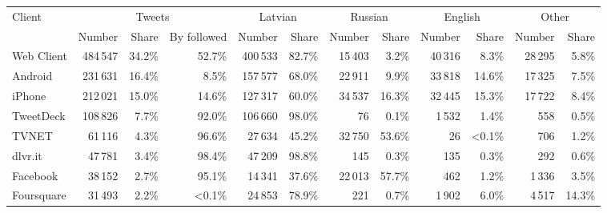 \begin{tabular}{lrrrrrrrrrrr}
\toprule
\multirow{2}{*}{Client} & \multicolumn{3}{c}{Tweets} & \multicolumn{2}{c}{Latvian} & \multicolumn{2}{c}{Russian} & \multicolumn{2}{c}{English} & \multicolumn{2}{c}{Other} \\
\cmidrule(r){2-4} \cmidrule(r){5-6} \cmidrule(r){7-8} \cmidrule(r){9-10} \cmidrule(r){11-12}
{} & Number & Share & By followed & Number & Share & Number & Share & Number & Share & Number & Share \\
\midrule
Web Client          &      484\,547   &       34.2\% &                52.7\% &            400\,533 &             82.7\% &             15\,403 &              3.2\% &             40\,316 &              8.3\% &            28\,295 &             5.8\% \\
Android             &      231\,631   &       16.4\% &                 8.5\% &            157\,577 &             68.0\% &             22\,911 &              9.9\% &             33\,818 &             14.6\% &            17\,325 &             7.5\% \\
iPhone              &      212\,021   &       15.0\% &                14.6\% &            127\,317 &             60.0\% &             34\,537 &             16.3\% &             32\,445 &             15.3\% &            17\,722 &             8.4\% \\
TweetDeck           &      108\,826   &        7.7\% &                92.0\% &            106\,660 &             98.0\% &                76   &              0.1\% &              1\,532 &              1.4\% &              558   &             0.5\% \\
TVNET               &       61\,116   &        4.3\% &                96.6\% &             27\,634 &             45.2\% &             32\,750 &             53.6\% &                26   &              <0.1\% &              706   &             1.2\% \\
dlvr.it             &       47\,781   &        3.4\% &                98.4\% &             47\,209 &             98.8\% &               145   &              0.3\% &               135   &              0.3\% &              292   &             0.6\% \\
Facebook            &       38\,152   &        2.7\% &                95.1\% &             14\,341 &             37.6\% &             22\,013 &             57.7\% &               462   &              1.2\% &             1\,336 &             3.5\% \\
Foursquare          &       31\,493   &        2.2\% &                 <0.1\% &             24\,853 &             78.9\% &               221   &              0.7\% &              1\,902 &              6.0\% &             4\,517 &            14.3\% \\

\end{tabular}
